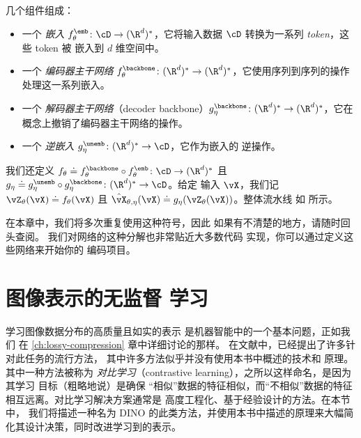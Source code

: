 \documentclass[../../book-main_zh.tex]{subfiles}
\begin{document}
\begin{itemize}
        几个组件组成：
        \begin{itemize}
            \item 一个 \textit{嵌入} \(f_{\theta}^{\emb} \colon
                \cD \to (\R^{d})^{*}\)，它将输入数据
                \(\cD\) 转换为一系列 \textit{token}，这些 token 被
                嵌入到 \(d\) 维空间中。
            \item 一个 \textit{编码器主干网络}
                \(f_{\theta}^{\backbone} \colon (\R^{d})^{*} \to
                (\R^{d})^{*}\)，它使用序列到序列的操作
                处理这一系列嵌入。
            \item 一个 \textit{解码器主干网络}（decoder backbone）\(g_{\eta}^{\backbone}
                \colon (\R^{d})^{*} \to (\R^{d})^{*}\)，它在
                概念上撤销了编码器主干网络的操作。
            \item 一个 \textit{逆嵌入} \(g_{\eta}^{\unemb} \colon
                (\R^{d})^{*} \to \cD\)，它作为嵌入的
                逆操作。
        \end{itemize}
        我们还定义 \(f_{\theta} \doteq f_{\theta}^{\backbone}
        \circ f_{\theta}^{\emb} \colon \cD \to (\R^{d})^{*}\) 且
        \(g_{\eta} \doteq g_{\eta}^{\unemb} \circ
        g_{\eta}^{\backbone} \colon (\R^{d})^{*} \to \cD\)。给定
        输入 \(\vX\)，我们记 \(\vZ_{\theta}(\vX) \doteq
        f_{\theta}(\vX)\) 且 \(\hat{\vX}_{\theta, \eta}(\vX) \doteq
        g_{\eta}(\vZ_{\theta}(\vX))\)。整体流水线
        如  所示。
\end{itemize}

在本章中，我们将多次重复使用这种符号，因此
如果有不清楚的地方，请随时回头查阅。
我们对网络的这种分解也非常贴近大多数代码
实现，你可以通过定义这些网络来开始你的
编码项目。

\section{图像表示的无监督
学习}\label{sec:contrastive_learning}

学习图像数据分布的高质量且如实的表示
是机器智能中的一个基本问题，正如我们
在 \ref{ch:lossy-compression} 章中详细讨论的那样。
在文献中，已经提出了许多针对此任务的流行方法，
其中许多方法似乎并没有使用本书中概述的技术和
原理。其中一种方法被称为
\textit{对比学习}（contrastive learning），之所以这样命名，是因为其学习
目标（粗略地说）是确保
“相似”数据的特征相似，而“不相似”数据的特征
相互远离。对比学习解决方案通常是
高度工程化、基于经验设计的方法。在本节中，
我们将描述一种名为 DINO \citep{caron2021emerging} 的此类方法，并使用本书中描述的原理来大幅简化其设计决策，同时改进学习到的表示。
\end{document}
